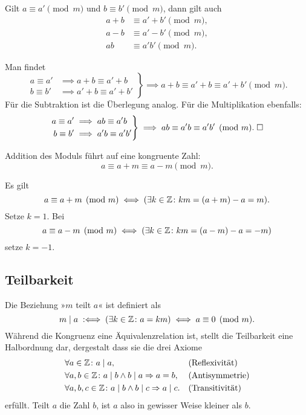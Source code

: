 \begin{Satz}
Gilt $a\equiv a'\pmod{m}$ und
$b\equiv b'\pmod{m}$, dann gilt auch
\begin{align*}
a+b&\equiv a'+b'\pmod{m},\\
a-b&\equiv a'-b'\pmod{m},\\
ab&\equiv a'b'\pmod{m}.
\end{align*}
\end{Satz}
 Man findet
\[\left.\begin{aligned}
a\equiv a'&\implies a+b\equiv a'+b\\
b\equiv b'&\implies a'+b\equiv a'+b'
\end{aligned}\right\}
\implies a+b\equiv a'+b\equiv a'+b'\pmod{m}.\]
Für die Subtraktion ist die Überlegung analog. Für die Multiplikation
ebenfalls:%
\[\left.\begin{aligned}
a\equiv a'&\implies ab\equiv a'b\\
b\equiv b'&\implies a'b\equiv a'b'
\end{aligned}\right\}
\implies ab\equiv a'b\equiv a'b'\pmod{m}.\;\Box\]

\begin{Satz}
Addition des Moduls führt auf eine kongruente Zahl:%
\[a\equiv a+m\equiv a-m\pmod{m}.\]
\end{Satz}
\begin{Beweis}
Es gilt
\[a\equiv a+m\pmod{m}\iff (\exists k\in\mathbb Z\colon km=(a+m)-a=m).\]
Setze $k=1$. Bei
\[a\equiv a-m\pmod{m}\iff (\exists k\in\mathbb Z\colon km=(a-m)-a=-m)\]
setze $k=-1$.\;\qedsymbol
\end{Beweis}

\subsection{Teilbarkeit}

Die Beziehung »$m$ teilt $a$« ist definiert als
\[m\mid a\;:\Longleftrightarrow\; (\exists k\in\mathbb Z\colon a=km) \iff a\equiv 0\pmod{m}.\]
Während die Kongruenz eine Äquivalenzrelation ist, stellt die
Teilbarkeit eine Halbordnung dar, dergestalt dass sie die drei Axiome
\begin{align*}
&\forall a\in\mathbb Z\colon a\mid a, &&\text{(Reflexivität)}\\
&\forall a,b\in\mathbb Z\colon a\mid b\land b\mid a\Rightarrow a = b,&&\text{(Antisymmetrie)}\\
&\forall a,b,c\in\mathbb Z\colon a\mid b\land b\mid c\Rightarrow a\mid c.&&\text{(Transitivität)}
\end{align*}
erfüllt. Teilt $a$ die Zahl $b$, ist $a$ also in gewisser Weise kleiner
als $b$.


